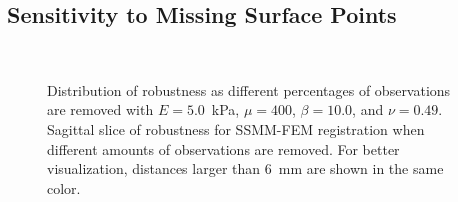 \documentclass[journal]{IEEEtran}
\begin{document}
\subsection{Sensitivity to Missing Surface Points}\label{sec:exp2}


\begin{figure}[ht]
	\centering
	\\
	\caption{Distribution of robustness as different percentages of observations are removed with $E=5.0$~kPa, $\mu=400$, $\beta=10.0$, and $\nu=0.49$. Sagittal slice of robustness for SSMM-FEM registration when different amounts of observations are removed. For better visualization, distances larger than 6~mm are shown in the same color.}\label{fig:Missing}
\end{figure}
\end{document}

